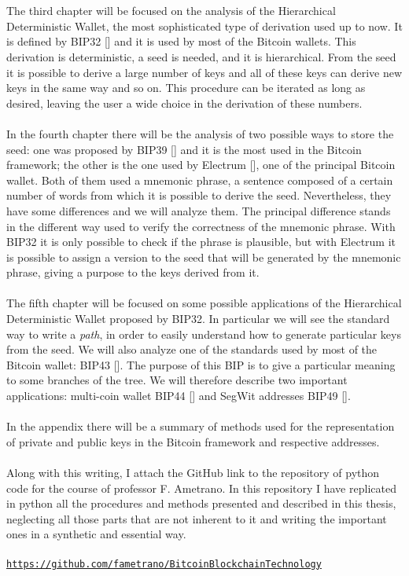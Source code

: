 \\ \\
The third chapter will be focused on the analysis of the Hierarchical Deterministic Wallet, the most sophisticated type of derivation used up to now. It is defined by BIP32 [\cite{1}] and it is used by most of the Bitcoin wallets. This derivation is deterministic, a seed is needed, and it is hierarchical. From the seed it is possible to derive a large number of keys and all of these keys can derive new keys in the same way and so on. This procedure can be iterated as long as desired, leaving the user a wide choice in the derivation of these numbers.
\\ \\
In the fourth chapter there will be the analysis of two possible ways to store the seed: one was proposed by BIP39 [\cite{2}] and it is the most used in the Bitcoin framework; the other is the one used by Electrum [\cite{3}], one of the principal Bitcoin wallet. Both of them used a mnemonic phrase, a sentence composed of a certain number of words from which it is possible to derive the seed. Nevertheless, they have some differences and we will analyze them. The principal difference stands in the different way used to verify the correctness of the mnemonic phrase. With BIP32 it is only possible to check if the phrase is plausible, but with Electrum it is possible to assign a version to the seed that will be generated by the mnemonic phrase, giving a purpose to the keys derived from it.
\\ \\
The fifth chapter will be focused on some possible applications of the Hierarchical Deterministic Wallet proposed by BIP32. In particular we will see the standard way to write a \textit{path}, in order to easily understand how to generate particular keys from the seed.  We will also analyze one of the standards used by most of the Bitcoin wallet: BIP43 [\cite{4}]. The purpose of this BIP is to give a particular meaning to some branches of the tree. We will therefore describe two important applications: multi-coin wallet BIP44 [\cite{5}] and SegWit addresses BIP49 [\cite{6}].
\\ \\
In the appendix there will be a summary of methods used for the representation of private and public keys in the Bitcoin framework and respective addresses.
\\ \\
Along with this writing, I attach the GitHub link to the repository of python code for the course of professor F. Ametrano. In this repository I have replicated in python all the procedures and methods presented and described in this thesis, neglecting all those parts that are not inherent to it and writing the important ones in a synthetic and essential way.
\\ \\
\hypersetup{
	colorlinks=true,
	urlcolor=black
}
\href{https://github.com/fametrano/BitcoinBlockchainTechnology}{\texttt{https://github.com/fametrano/BitcoinBlockchainTechnology}}
